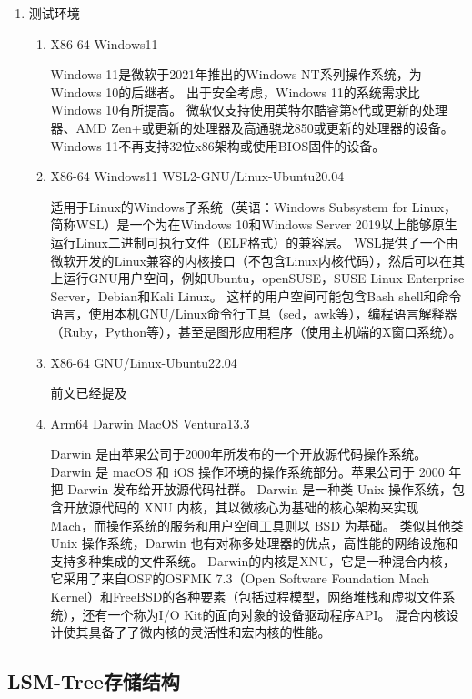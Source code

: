 \begin{enumerate}[fullwidth,itemindent=2em,listparindent=2em]
\begin{enumerate}
			\end{enumerate}
		\item 测试环境
			\begin{enumerate}
				\item {X86-64 Windows11}
				
				Windows 11是微软于2021年推出的Windows NT系列操作系统，为Windows 10的后继者。
				出于安全考虑，Windows 11的系统需求比Windows 10有所提高。
				微软仅支持使用英特尔酷睿第8代或更新的处理器、AMD Zen+或更新的处理器及高通骁龙850或更新的处理器的设备。
				Windows 11不再支持32位x86架构或使用BIOS固件的设备。
				\item X86-64 Windows11 WSL2-GNU/Linux-Ubuntu20.04
				
				适用于Linux的Windows子系统（英语：Windows Subsystem for Linux，简称WSL）是一个为在Windows 10和Windows Server 2019以上能够原生运行Linux二进制可执行文件（ELF格式）的兼容层。
				WSL提供了一个由微软开发的Linux兼容的内核接口（不包含Linux内核代码），然后可以在其上运行GNU用户空间，例如Ubuntu，openSUSE，SUSE Linux Enterprise Server，Debian和Kali Linux。
				这样的用户空间可能包含Bash shell和命令语言，使用本机GNU/Linux命令行工具（sed，awk等），编程语言解释器（Ruby，Python等），甚至是图形应用程序（使用主机端的X窗口系统）。
				\item X86-64 GNU/Linux-Ubuntu22.04
				
				前文已经提及
				\item Arm64 Darwin MacOS Ventura13.3
				
				Darwin 是由苹果公司于2000年所发布的一个开放源代码操作系统。Darwin 是 macOS 和 iOS 操作环境的操作系统部分。苹果公司于 2000 年把 Darwin 发布给开放源代码社群。
				Darwin 是一种类 Unix 操作系统，包含开放源代码的 XNU 内核，其以微核心为基础的核心架构来实现 Mach，而操作系统的服务和用户空间工具则以 BSD 为基础。
				类似其他类 Unix 操作系统，Darwin 也有对称多处理器的优点，高性能的网络设施和支持多种集成的文件系统。
				Darwin的内核是XNU，它是一种混合内核，它采用了来自OSF的OSFMK 7.3（Open Software Foundation Mach Kernel）和FreeBSD的各种要素（包括过程模型，网络堆栈和虚拟文件系统），还有一个称为I/O Kit的面向对象的设备驱动程序API。
				混合内核设计使其具备了了微内核的灵活性和宏内核的性能。
			\end{enumerate}
  
  	\end{enumerate}
     
    \subsection{LSM-Tree存储结构}
    
